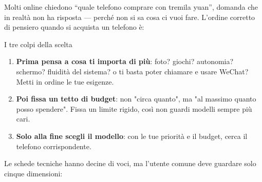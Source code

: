 


Molti online chiedono “quale telefono comprare con tremila yuan”, domanda che in realtà non ha risposta — perché non si sa cosa ci vuoi fare. L'ordine corretto di pensiero quando si acquista un telefono è:

\begin{tcbinfo}{I tre colpi della scelta}
\begin{enumerate}
  \item \textbf{Prima pensa a cosa ti importa di più}: foto? giochi? autonomia? schermo? fluidità del sistema? o ti basta poter chiamare e usare WeChat? Metti in ordine le tue esigenze.
  \item \textbf{Poi fissa un tetto di budget}: non "circa quanto", ma "al massimo quanto posso spendere". Fissa un limite rigido, così non guardi modelli sempre più cari.
  \item \textbf{Solo alla fine scegli il modello}: con le tue priorità e il budget, cerca il telefono corrispondente.
\end{enumerate}

\end{tcbinfo}


Le schede tecniche hanno decine di voci, ma l'utente comune deve guardare solo cinque dimensioni:

